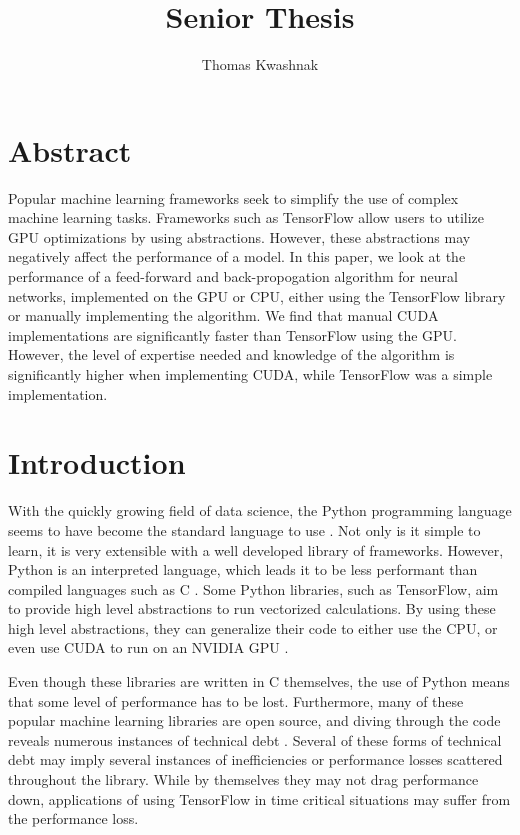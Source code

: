 \documentclass[12pt]{article}
\author{Thomas Kwashnak}
\title{Senior Thesis}
\newcommand{\CC}{C\nolinebreak\hspace{-.05em}\raisebox{.4ex}{\tiny\bf +}\nolinebreak\hspace{-.10em}\raisebox{.4ex}{\tiny\bf +} }
\begin{document}
\maketitle

\newpage

\newpage

\section{Abstract}

Popular machine learning frameworks seek to simplify the use of complex machine learning tasks.
Frameworks such as TensorFlow allow users to utilize GPU optimizations by using abstractions.
However, these abstractions may negatively affect the performance of a model.
In this paper, we look at the performance of a feed-forward and back-propogation algorithm for neural networks, implemented on the GPU or CPU, either using the TensorFlow library or manually implementing the algorithm.
We find that manual CUDA implementations are significantly faster than TensorFlow using the GPU.
However, the level of expertise needed and knowledge of the algorithm is significantly higher when implementing CUDA, while TensorFlow was a simple implementation.


\section{Introduction}

With the quickly growing field of data science, the Python programming language seems to have become the standard language to use \cite{article_python_growing_language}.
Not only is it simple to learn, it is very extensible with a well developed library of frameworks.
However, Python is an interpreted language, which leads it to be less performant than compiled languages such as \CC \cite{article_compiled_interpreted_hybrid_languages}.
Some Python libraries, such as TensorFlow, aim to provide high level abstractions to run vectorized calculations.
By using these high level abstractions, they can generalize their code to either use the CPU, or even use CUDA \cite{lib_cuda} to run on an NVIDIA GPU \cite{lib_tensorflow}.

Even though these libraries are written in \CC themselves, the use of Python means that some level of performance has to be lost.
Furthermore, many of these popular machine learning libraries are open source, and diving through the code reveals numerous instances of technical debt \cite{article_deep_learning_framework_debt}.
Several of these forms of technical debt may imply several instances of inefficiencies or performance losses scattered throughout the library.
While by themselves they may not drag performance down, applications of using TensorFlow in time critical situations may suffer from the performance loss.
\end{document}
